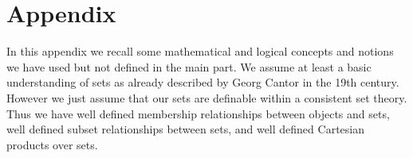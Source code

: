 

\chapter{Appendix}



In this appendix we recall some mathematical and logical concepts and notions 
we have used but not defined in the main part.
We assume at least a {\myem basic} understanding of sets as already 
described by Georg Cantor in the 19th century. 
However we just assume that our sets are definable within a consistent set theory.
Thus we have well defined {\myem membership} relationships between objects and sets,
well defined {\myem subset} relationships between sets, 
and well defined {\myem Cartesian products} over sets.










